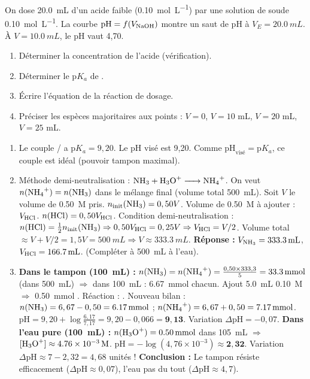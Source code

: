 \documentclass[11pt]{article}
\begin{document}
\begin{exercice}
On dose \SI{20,0}{mL} d'un acide faible  (\SI{0,10}{mol.L^{-1}}) par une solution de soude \SI{0,10}{mol.L^{-1}}. La courbe $\mathrm{pH} = f(V_{\ce{NaOH}})$ montre un saut de pH à $V_E = \SI{20,0}{mL}$. À $V = \SI{10,0}{mL}$, le pH vaut 4,70.
\begin{enumerate}
  \item Déterminer la concentration de l'acide  (vérification).
  \item Déterminer le $\mathrm{p}K_a$ de .
  \item Écrire l'équation de la réaction de dosage.
  \item Préciser les espèces majoritaires aux points : $V=0$, $V=10$ mL, $V=20$ mL, $V=25$ mL.
\end{enumerate}
\end{exercice}

\begin{corrige}
\begin{enumerate}
  \item Le couple / a $\mathrm{p}K_a = 9,20$. Le pH visé est 9,20. Comme $\mathrm{pH}_{\text{visé}} = \mathrm{p}K_a$, ce couple est idéal (pouvoir tampon maximal).
  \item Méthode demi-neutralisation : $\ce{NH3 + H3O+ -> NH4+}$.
  On veut $n(\ce{NH4+}) = n(\ce{NH3})$ dans le mélange final (volume total \SI{500}{mL}).
  Soit $V$ le volume de  \SI{0,50}{M} pris. $n_{\text{init}}(\ce{NH3}) = 0,50 V$.
  Volume de  \SI{0,50}{M} à ajouter : $V_{\ce{HCl}}$. $n(\ce{HCl}) = 0,50 V_{\ce{HCl}}$.
  Condition demi-neutralisation : $n(\ce{HCl}) = \frac{1}{2} n_{\text{init}}(\ce{NH3}) \Rightarrow 0,50 V_{\ce{HCl}} = 0,25 V \Rightarrow V_{\ce{HCl}} = V/2$.
  Volume total $\approx V + V/2 = 1,5 V = \SI{500}{mL} \Rightarrow V \approx \SI{333,3}{mL}$.
  \textbf{Réponse :} $V_{\ce{NH3}} = \SI{333,3}{mL}$, $V_{\ce{HCl}} = \SI{166,7}{mL}$. (Compléter à \SI{500}{mL} à l'eau).
  \item \textbf{Dans le tampon (\SI{100}{mL}) :}
  $n(\ce{NH3}) = n(\ce{NH4+}) = \frac{0,50 \times 333,3}{5} = \SI{33,3}{mmol}$ (dans \SI{500}{mL}) $\Rightarrow$ dans \SI{100}{mL} : \SI{6,67}{mmol} chacun.
  Ajout \SI{5,0}{mL}  \SI{0,10}{M} $\Rightarrow$ \SI{0,50}{mmol} .
  Réaction : .
  Nouveau bilan : $n(\ce{NH3}) = 6,67 - 0,50 = \SI{6,17}{mmol}$ ; $n(\ce{NH4+}) = 6,67 + 0,50 = \SI{7,17}{mmol}$.
  $\mathrm{pH} = 9,20 + \log\frac{6,17}{7,17} = 9,20 - 0,066 = \mathbf{9,13}$.
  Variation $\Delta\mathrm{pH} = -0,07$.
  \textbf{Dans l'eau pure (\SI{100}{mL}) :}
  $n(\ce{H3O+}) = \SI{0,50}{mmol}$ dans \SI{105}{mL} $\Rightarrow$ $[\ce{H3O+}] \approx \SI{4,76e-3}{M}$.
  $\mathrm{pH} = -\log(4,76\times10^{-3}) \approx \mathbf{2,32}$.
  Variation $\Delta\mathrm{pH} \approx 7 - 2,32 = 4,68$ unités !
  \textbf{Conclusion :} Le tampon résiste efficacement ($\Delta\mathrm{pH} \approx 0,07$), l'eau pas du tout ($\Delta\mathrm{pH} \approx 4,7$).
\end{enumerate}
\end{corrige}
\end{document}
